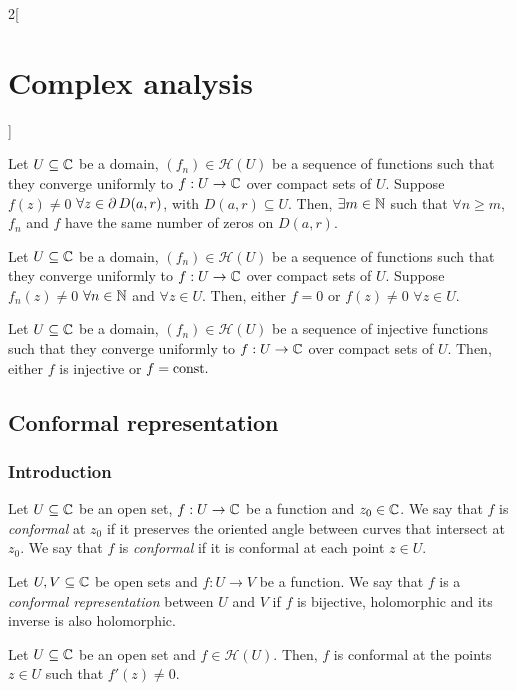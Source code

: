 \documentclass[../../../main_math.tex]{subfiles}
\begin{document}
\begin{multicols}{2}[\section{Complex analysis}]
\begin{theorem}
  \end{theorem}
  \begin{theorem}
    Let $U\subseteq \mathbb{C}$ be a domain, $(f_n)\in\mathcal{H}(U)$ be a sequence of functions such that they converge uniformly to $f:U\rightarrow\mathbb{C}$ over compact sets of $U$. Suppose $f(z)\ne 0$ $\forall z\in\operatorname{\partial}{D(a,r)}$, with $D(a,r)\subseteq U$. Then, $\exists m\in\mathbb{N}$ such that $\forall n\geq m$, $f_n$ and $f$ have the same number of zeros on $D(a,r)$.
  \end{theorem}
  \begin{corollary}
    Let $U\subseteq \mathbb{C}$ be a domain, $(f_n)\in\mathcal{H}(U)$ be a sequence of functions such that they converge uniformly to $f:U\rightarrow\mathbb{C}$ over compact sets of $U$. Suppose $f_n(z)\ne 0$ $\forall n\in\mathbb{N}$ and $\forall z\in U$. Then, either $f=0$ or $f(z)\ne 0$ $\forall z\in U$.
  \end{corollary}
  \begin{corollary}
    Let $U\subseteq \mathbb{C}$ be a domain, $(f_n)\in\mathcal{H}(U)$ be a sequence of injective functions such that they converge uniformly to $f:U\rightarrow\mathbb{C}$ over compact sets of $U$. Then, either $f$ is injective or $f=\text{const.}$
  \end{corollary}
  \subsection{Conformal representation}
  \subsubsection{Introduction}
  \begin{definition}
    Let $U\subseteq \mathbb{C}$ be an open set, $f:U\rightarrow\mathbb{C}$ be a function and $z_0\in\mathbb{C}$. We say that $f$ is \emph{conformal} at $z_0$ if it preserves the oriented angle between curves that intersect at $z_0$. We say that $f$ is \emph{conformal} if it is conformal at each point $z\in U$.
  \end{definition}
  \begin{definition}
    Let $U,V\subseteq \mathbb{C}$ be open sets and $f:U\rightarrow V$ be a function. We say that $f$ is a \emph{conformal representation} between $U$ and $V$ if $f$ is bijective, holomorphic and its inverse is also holomorphic.
  \end{definition}
  \begin{theorem}
    Let $U\subseteq \mathbb{C}$ be an open set and $f\in\mathcal{H}(U)$. Then, $f$ is conformal at the points $z\in U$ such that $f'(z)\ne 0$.
  \end{theorem}

\end{multicols}
\end{document}
